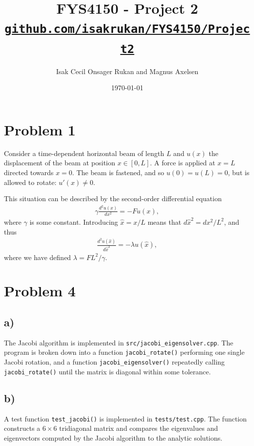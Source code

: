 \documentclass[english,notitlepage,reprint,nofootinbib]{revtex4-2}  %
\begin{document}
\title{FYS4150 - Project 2\\[0.5em]
  \small \href{https://github.com/isakrukan/FYS4150/tree/main/Project2}{\texttt{github.com/isakrukan/FYS4150/Project2}}
}
\author{Isak Cecil Onsager Rukan and Magnus Axelsen} %
\date{\today}                             %
\noaffiliation                            %
\maketitle

\section{Problem 1}
Consider a time-dependent horizontal beam of length \(L\) and \(u(x)\) the displacement of the beam at position \(x\in[0,L]\). A force is applied at \(x=L\) directed towards \(x=0\). The beam is fastened, and so \(u(0)=u(L)=0\), but is allowed to rotate: \(u'(x)\neq 0\).

This situation can be described by the second-order differential equation
\begin{align}
    \gamma \frac{d^2u(x)}{dx^2} = -Fu(x),
\end{align}
where \(\gamma\) is some constant. Introducing \(\hat{x}=x/L\) means that \(d\hat{x}^2 = dx^2/L^2\), and thus 
\begin{align}
    \frac{d^2u(\hat{x})}{d\hat{x}^2} 
    = -\lambda u(\hat{x}),
\end{align}
where we have defined \(\lambda = FL^2/\gamma\).

\section{Problem 4}
\subsection*{a)}
The Jacobi algorithm is implemented in \texttt{src/jacobi\_eigensolver.cpp}.
The program is broken down into a function \texttt{jacobi\_rotate()} performing one single Jacobi rotation, and a function \texttt{jacobi\_eigensolver()} repeatedly calling \texttt{jacobi\_rotate()} until the matrix is diagonal within some tolerance. 

\subsection*{b)}
A test function \texttt{test\_jacobi()} is implemented in \texttt{tests/test.cpp}.
The function constructs a $6\times6$ tridiagonal matrix and compares the eigenvalues and eigenvectors computed by the Jacobi algorithm to the analytic solutions.
\end{document}
